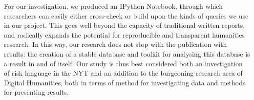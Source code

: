 For our investigation, we produced an IPython Notebook, through which researchers can easily either cross-check or build upon the kinds of queries we use in our project. This goes well beyond the capacity of traditional written reports, and radically expands the potential for reproducible and transparent humanities research. In this way, our research does not stop with the publication with results: the creation of a stable database and toolkit for analysing this database is a result in and of itself. Our study is thus best considered both an investigation of risk language in the NYT and an addition to the burgeoning research area of Digital Humanities, both in terms of method for investigating data and methods for presenting results.
